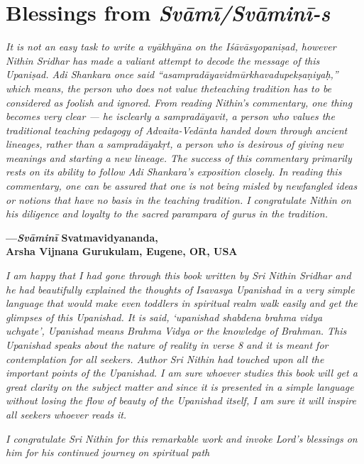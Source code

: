 \chapter{Blessings from \emph{Svāmī/Svāminī-s}}

\emph{It is not an easy task to write a vyākhyāna on the Iśāvāsyopaniṣad, however Nithin Sridhar has made a valiant attempt to decode the message of this Upaniṣad. Adi Shankara once said ``asampradāyavidmūrkha\-vadupekṣaṇiyaḥ,'' which means, the person who does not value the\break teaching tradition has to be considered as foolish and ignored. From reading Nithin's commentary, one thing becomes very clear --- he is\break clearly a sampradāyavit, a person who values the traditional teaching pedagogy of Advaita-Vedānta handed down through ancient lineages, rather than a sampradāyakṛt, a person who is desirous of giving new meanings and starting a new lineage. The success of this commentary primarily rests on its ability to follow Adi Shankara's exposition closely. In reading this commentary, one can be assured that one is not being misled by newfangled ideas or notions that have no basis in the teaching tradition. I congratulate Nithin on his diligence and loyalty to the sacred parampara of gurus in the tradition.}
\medskip

\begin{flushright}
\textbf{---\emph{Svāminī} Svatmavidyananda,}\\
\textbf{Arsha Vijnana Gurukulam, Eugene, OR, USA}
\end{flushright}
\medskip

\emph{I am happy that I had gone through this book written by Sri Nithin Sridhar and he had beautifully explained the thoughts of Isavasya Upanishad in a very simple language that would make even toddlers in spiritual realm walk easily and get the glimpses of this Upanishad. It is said, `upanishad shabdena brahma vidya uchyate', Upanishad means Brahma Vidya or the knowledge of Brahman. This Upanishad speaks about the nature of reality in verse 8 and it is meant for contemplation for all seekers. Author Sri Nithin had touched upon all the important points of the Upanishad. I am sure whoever studies this book will get a great clarity on the subject matter and since it is presented in a simple language without losing the flow of beauty of the Upanishad itself, I am sure it will inspire all seekers whoever reads it.}

\emph{I congratulate Sri Nithin for this remarkable work and invoke Lord's blessings on him for his continued journey on spiritual path}
\medskip

